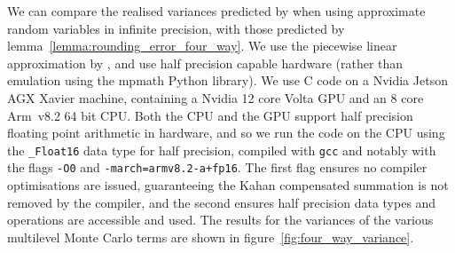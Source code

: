 \documentclass[manuscript,review]{acmart}
\begin{document}
We can compare the realised variances  predicted by  \citet{giles2020approximate,giles2020approximating} when using approximate random variables in infinite precision, with those predicted by lemma~\ref{lemma:rounding_error_four_way}. We use the piecewise linear approximation by \citet{giles2020approximating}, and use half precision capable hardware (rather than emulation using the mpmath Python library). We use C code on a Nvidia Jetson AGX Xavier machine, containing a Nvidia 12 core Volta GPU and an 8 core Arm~v8.2 64 bit CPU. Both the CPU and the GPU support half precision floating point arithmetic in hardware, and so we run the code on the CPU using the \texttt{\_Float16} data type for half precision,  compiled with \texttt{gcc} and notably with the flags \texttt{-O0} and \texttt{-march=armv8.2-a+fp16}. The first flag ensures no compiler optimisations are issued, guaranteeing the Kahan compensated summation is not removed by the compiler, and the second ensures half precision data types and operations are accessible and used. The results for the variances of the various multilevel Monte Carlo terms are shown in figure~\ref{fig:four_way_variance}.
\end{document}

